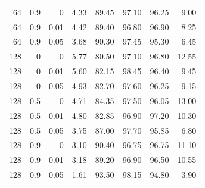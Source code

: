 \begin{longtable}{rrrrrrrr}
64 & 0.9 & 0 & 4.33 & 89.45 & 97.10 & 96.25 & 9.00 \\
64 & 0.9 & 0.01 & 4.42 & 89.40 & 96.80 & 96.90 & 8.25 \\
64 & 0.9 & 0.05 & 3.68 & 90.30 & 97.45 & 95.30 & 6.45 \\
128 & 0 & 0 & 5.77 & 80.50 & 97.10 & 96.80 & 12.55 \\
128 & 0 & 0.01 & 5.60 & 82.15 & 98.45 & 96.40 & 9.45 \\
128 & 0 & 0.05 & 4.93 & 82.70 & 97.60 & 96.25 & 9.15 \\
128 & 0.5 & 0 & 4.71 & 84.35 & 97.50 & 96.05 & 13.00 \\
128 & 0.5 & 0.01 & 4.80 & 82.85 & 96.90 & 97.20 & 10.30 \\
128 & 0.5 & 0.05 & 3.75 & 87.00 & 97.70 & 95.85 & 6.80 \\
128 & 0.9 & 0 & 3.10 & 90.40 & 96.75 & 96.75 & 11.10 \\
128 & 0.9 & 0.01 & 3.18 & 89.20 & 96.90 & 96.50 & 10.55 \\
128 & 0.9 & 0.05 & 1.61 & 93.50 & 98.15 & 94.80 & 3.90 \\
\bottomrule
\end{longtable}